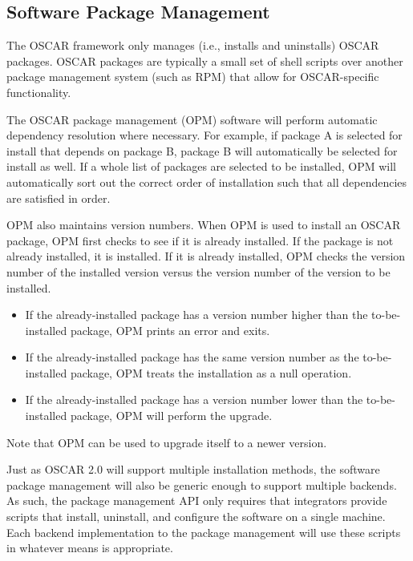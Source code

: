 \subsection{Software Package Management}
\label{sec:design-software-package-mgmt}

The OSCAR framework only manages (i.e., installs and uninstalls) OSCAR
packages.  OSCAR packages are typically a small set of shell scripts
over another package management system (such as RPM) that allow for
OSCAR-specific functionality.

The OSCAR package management (OPM) software will perform automatic
dependency resolution where necessary.  For example, if package A is
selected for install that depends on package B, package B will
automatically be selected for install as well.  If a whole list of
packages are selected to be installed, OPM will automatically sort out
the correct order of installation such that all dependencies are
satisfied in order.

OPM also maintains version numbers.  When OPM is used to install an
OSCAR package, OPM first checks to see if it is already installed.  If
the package is not already installed, it is installed.  If it is
already installed, OPM checks the version number of the installed
version versus the version number of the version to be installed.

\begin{itemize}
\item If the already-installed package has a version number higher
  than the to-be-installed package, OPM prints an error and exits.

\item If the already-installed package has the same version number as
  the to-be-installed package, OPM treats the installation as a null
  operation. 

\item If the already-installed package has a version number lower than
  the to-be-installed package, OPM will perform the upgrade.
\end{itemize}

Note that OPM can be used to upgrade itself to a newer version.

Just as OSCAR 2.0 will support multiple installation methods, the
software package management will also be generic enough to support
multiple backends.  As such, the package management API only requires
that integrators provide scripts that install, uninstall, and
configure the software on a single machine. Each backend
implementation to the package management will use these scripts in
whatever means is appropriate.

